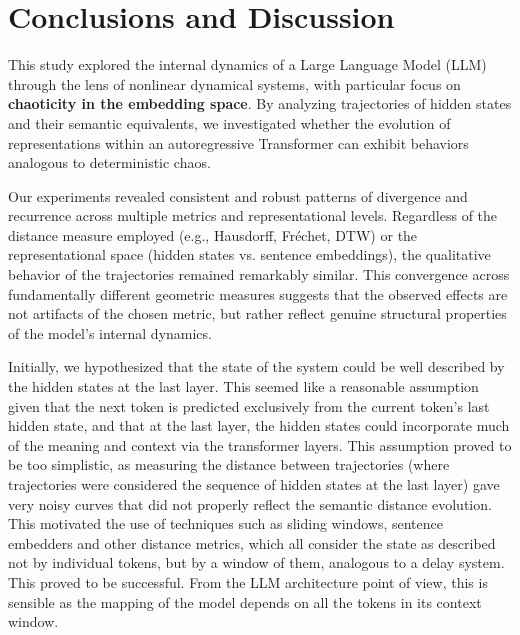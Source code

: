 \documentclass[a4paper,12pt]{article}
\begin{document}

\section{Conclusions and Discussion}
\label{sec:conclusions}


This study explored the internal dynamics of a Large Language Model (LLM) through the lens of nonlinear dynamical systems, with particular focus on \textbf{chaoticity in the embedding space}. By analyzing trajectories of hidden states and their semantic equivalents, we investigated whether the evolution of representations within an autoregressive Transformer can exhibit behaviors analogous to deterministic chaos.

Our experiments revealed consistent and robust patterns of divergence and recurrence across multiple metrics and representational levels. Regardless of the distance measure employed (e.g., Hausdorff, Fréchet, DTW) or the representational space (hidden states vs. sentence embeddings), the qualitative behavior of the trajectories remained remarkably similar. This convergence across fundamentally different geometric measures suggests that the observed effects are not artifacts of the chosen metric, but rather reflect genuine structural properties of the model's internal dynamics. 

Initially, we hypothesized that the state of the system could be well described by the hidden states at the last layer. This seemed like a reasonable assumption given that the next token is predicted exclusively from the current token's last hidden state, 
and that at the last layer, the hidden states could incorporate much of the meaning and context via the transformer layers.
This assumption proved to be too simplistic, as measuring the distance between trajectories (where trajectories were considered the sequence of hidden states at the last layer) gave very noisy curves that did not properly reflect the semantic distance evolution.
This motivated the use of techniques such as sliding windows, sentence embedders and other distance metrics, which all consider the state as described not by individual tokens, but by a window of them, analogous to a delay system. This proved to be successful. From the LLM architecture point of view, this is sensible as the mapping of the model depends on all the tokens in its context window. 
\end{document}

